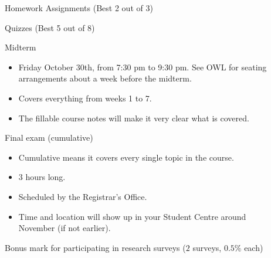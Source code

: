 \documentclass[../main.tex]{subfiles}
\begin{document}
\begin{description}
  \item[{}] Homework Assignments (Best 2 out of 3)

  \item[{}] Quizzes (Best 5 out of 8)

  \item[{}] Midterm
    \begin{itemize}
      \item Friday October 30th, from 7:30 pm to 9:30 pm. See OWL for seating arrangements about a week before the midterm.
      \item Covers everything from weeks 1 to 7.
      \item The fillable course notes will make it very clear what is covered.
    \end{itemize}

  \item[{}] Final exam (cumulative)
    \begin{itemize}
      \item Cumulative means it covers every single topic in the course.
      \item \(3\) hours long.
      \item Scheduled by the Registrar's Office.
      \item Time and location will show up in your Student Centre around November (if not earlier).
    \end{itemize}

  \item[{}] Bonus mark for participating in research surveys (\(2\) surveys, \(0.5\%\) each)
\end{description}
\end{document}
